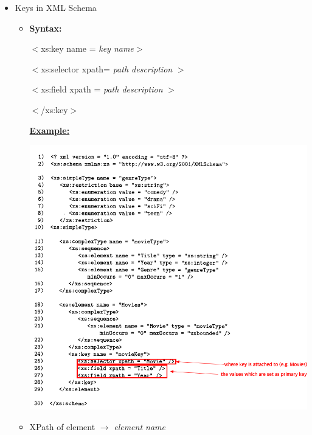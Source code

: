 \documentclass[12pt]{article}
\begin{document}
\begin{enumerate}[1.]
\begin{itemize}
        \item Keys in XML Schema
        \begin{itemize}
            \item \textbf{Syntax:}

            $<$xs:key name = \textit{key name}$>$

            \quad$<$xs:selector xpath= \textit{path description} $>$

            \quad$<$xs:field xpath = \textit{path description} $>$

            $<$/xs:key$>$

            \bigskip

            \underline{\textbf{Example:}}

            \bigskip

            \begin{center}
            \includegraphics[width=\linewidth]{images/worksheet_9_solution_12.png}
            \end{center}

            \item XPath of element $\to$ \textit{element name}


\end{itemize}
\end{itemize}
\end{enumerate}
\end{document}
